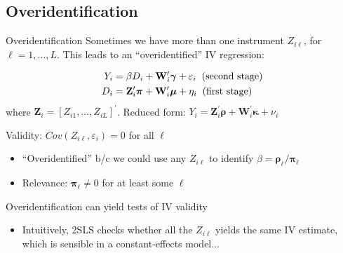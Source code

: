 \documentclass{beamer}
\begin{document}
\subsection{Overidentification}
\begin{frame}{Overidentification}
Sometimes we have more than one instrument $Z_{i\ell}$, for $\ell=1,\dots,L$. This leads to an ``overidentified'' IV regression:

\vspace{-1cm}
\begin{align*}
Y_i &=  \beta D_i +\mathbf{W}_i^\prime\boldsymbol{\gamma} +  \varepsilon_i\hspace{0.2cm}\text{(second stage)}\\
D_i &= \mathbf{Z}_i^\prime\boldsymbol{\pi} + \mathbf{W}_i^\prime\boldsymbol{\mu} + \eta_i\hspace{0.2cm}\text{(first stage)}
\end{align*}
where $\mathbf{Z}_i=[Z_{i1},\dots,Z_{iL}]^\prime$. Reduced form: $Y_i= \mathbf{Z}_i^\prime\boldsymbol{\rho} + \mathbf{W}_i^\prime\boldsymbol{\kappa}+\nu_i $\pause

Validity: $Cov(Z_{i\ell},\varepsilon_i)=0$ for all $\ell$
\begin{itemize}
  \item ``Overidentified'' b/c we could use any $Z_{i\ell}$ to identify $\beta=\boldsymbol{\rho}_\ell/\boldsymbol{\pi}_\ell$\pause
  \item Relevance: $\boldsymbol{\pi}_\ell\neq 0$ for at least some $\ell$
\end{itemize}\pause\medskip

Overidentification can yield tests of IV validity
\begin{itemize}
  \item Intuitively, 2SLS checks whether all the $Z_{i\ell}$ yields the same IV estimate, which is sensible in a constant-effects model...
\end{itemize}
\end{frame}
\end{document}

